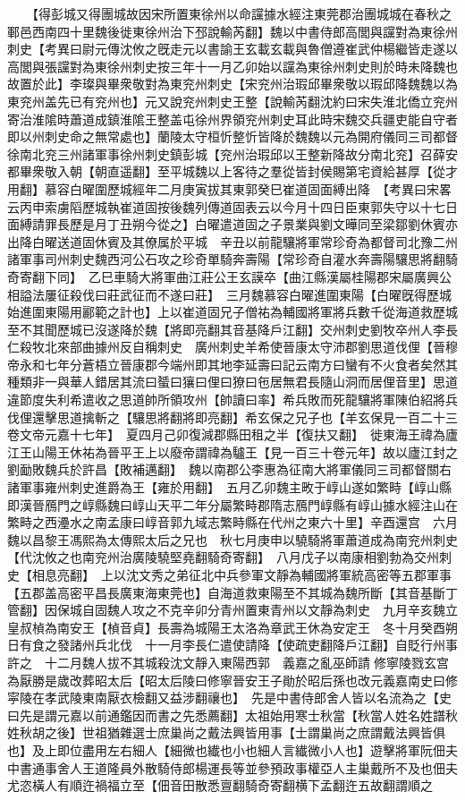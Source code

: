 　　【得彭城又得團城故因宋所置東徐州以命讜據水經注東莞郡治團城城在春秋之鄆邑西南四十里魏後徙東徐州治下邳說輸芮翻】魏以中書侍郎高閭與讜對為東徐州刺史【考異曰尉元傳沈攸之旣走元以書諭王玄載玄載與魯僧遵崔武仲楊繼皆走遂以高閭與張讜對為東徐州刺史按三年十一月乙卯始以讜為東徐州刺史則於時未降魏也故置於此】李璨與畢衆敬對為東兖州刺史【宋兖州治瑕邱畢衆敬以瑕邱降魏魏以為東兖州盖先已有兖州也】元又說兖州刺史王整【說輸芮翻沈約曰宋失淮北僑立兖州寄治淮隂時蕭道成鎮淮隂王整盖屯徐州界領兖州刺史耳此時宋魏交兵疆吏能自守者即以州刺史命之無常處也】蘭陵太守桓忻整忻皆降於魏魏以元為開府儀同三司都督徐南北兖三州諸軍事徐州刺史鎮彭城【兖州治瑕邱以王整新降故分南北兖】召薛安都畢衆敬入朝【朝直遥翻】至平城魏以上客待之羣從皆封侯賜第宅資給甚厚【從才用翻】慕容白曜圍歷城經年二月庚寅拔其東郭癸巳崔道固面縛出降　【考異曰宋畧云丙申索虜䧟歷城執崔道固按後魏列傳道固表云以今月十四日臣東郭失守以十七日面縛請罪長歷是月丁丑朔今從之】白曜遣道固之子景業與劉文曄同至梁鄒劉休賓亦出降白曜送道固休賓及其僚属於平城　辛丑以前龍驤將軍常珍奇為都督司北豫二州諸軍事司州刺史魏西河公石攻之珍奇單騎奔壽陽【常珍奇自灌水奔壽陽驤思將翻騎奇寄翻下同】　乙巳車騎大將軍曲江莊公王玄謨卒【曲江縣漢屬桂陽郡宋屬廣興公相謚法屢征殺伐曰莊武征而不遂曰莊】　三月魏慕容白曜進圍東陽【白曜旣得歷城始進圍東陽用酈範之計也】上以崔道固兄子僧祐為輔國將軍將兵數千從海道救歷城至不其聞歷城已沒遂降於魏【將即亮翻其音基降戶江翻】交州刺史劉牧卒州人李長仁殺牧北來部曲據州反自稱刺史　廣州刺史羊希使晉康太守沛郡劉思道伐俚【晉穆帝永和七年分蒼梧立晉康郡今端州即其地李延壽曰記云南方曰蠻有不火食者矣然其種類非一與華人錯居其流曰蜑曰獽曰俚曰獠曰㐌居無君長隨山洞而居俚音里】思道違節度失利希遣收之思道帥所領攻州【帥讀曰率】希兵敗而死龍驤將軍陳伯紹將兵伐俚還擊思道擒斬之【驤思將翻將即亮翻】希玄保之兄子也【羊玄保見一百二十三卷文帝元嘉十七年】　夏四月己卯復減郡縣田租之半【復扶又翻】　徙東海王禕為廬江王山陽王休祐為晉平王上以廢帝謂禕為驢王【見一百三十卷元年】故以廬江封之　劉勔敗魏兵於許昌【敗補邁翻】　魏以南郡公李惠為征南大將軍儀同三司都督關右諸軍事雍州刺史進爵為王【雍於用翻】　五月乙卯魏主畋于崞山遂如繁畤【崞山縣即漢晉鴈門之崞縣魏曰崞山天平二年分屬繁畤郡隋志鴈門崞縣有崞山據水經注山在繁畤之西灅水之南孟康曰崞音郭九域志繁畤縣在代州之東六十里】辛酉還宫　六月魏以昌黎王馮熙為太傳熙太后之兄也　秋七月庚申以驍騎將軍蕭道成為南兖州刺史【代沈攸之也南兖州治廣陵驍堅堯翻騎奇寄翻】　八月戊子以南康相劉勃為交州刺史【相息亮翻】　上以沈文秀之弟征北中兵參軍文靜為輔國將軍統高密等五郡軍事【五郡盖高密平昌長廣東海東莞也】自海道救東陽至不其城為魏所斷【其音基斷丁管翻】因保城自固魏人攻之不克辛卯分青州置東青州以文靜為刺史　九月辛亥魏立皇叔楨為南安王【楨音貞】長壽為城陽王太洛為章武王休為安定王　冬十月癸酉朔日有食之發諸州兵北伐　十一月李長仁遣使請降【使疏吏翻降戶江翻】自貶行州事許之　十二月魏人拔不其城殺沈文靜入東陽西郭　義嘉之亂巫師請修寧陵戮玄宫為厭勝是歲改葬昭太后【昭太后陵曰修寧晉安王子勛於昭后孫也改元義嘉南史曰修寜陵在孝武陵東南厭衣檢翻又益涉翻禳也】　先是中書侍郎舍人皆以名流為之【史曰先是謂元嘉以前通鑑因而書之先悉薦翻】太祖始用寒士秋當【秋當人姓名姓譜秋姓秋胡之後】世祖猶雜選士庶巢尚之戴法興皆用事【士謂巢尚之庶謂戴法興皆俱也】及上即位盡用左右細人【細微也纎也小也細人言纎微小人也】遊擊將軍阮佃夫中書通事舍人王道隆員外散騎侍郎楊運長等並參預政事權亞人主巢戴所不及也佃夫尤恣橫人有順迕禍福立至【佃音田散悉亶翻騎奇寄翻横下孟翻迕五故翻謂順之